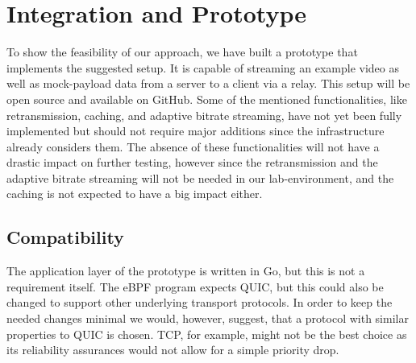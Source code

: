\section{Integration and Prototype}\label{sec:integration_and_prototype}

To show the feasibility of our approach, we have built a prototype 
that implements the suggested setup.
It is capable of streaming an example video as well as mock-payload data from 
a server to a client via a relay.
This setup will be open source and available on GitHub.
Some of the mentioned functionalities, like retransmission, caching, and adaptive
bitrate streaming, have not yet been fully implemented but should not require major
additions since the infrastructure already considers them.
The absence of these functionalities will not have a drastic impact on further 
testing, however since the retransmission and the adaptive bitrate streaming will not
be needed in our lab-environment, and the caching is not expected to have a big impact
either.

\subsection{Compatibility}
The application layer of the prototype is written in Go, but this is not a requirement
itself.
The eBPF program expects QUIC, but this could also be changed to support other underlying 
transport protocols.
In order to keep the needed changes minimal we would, however, suggest, that a protocol
with similar properties to QUIC is chosen.
TCP, for example, might not be the best choice as its reliability assurances would not 
allow for a simple priority drop.

